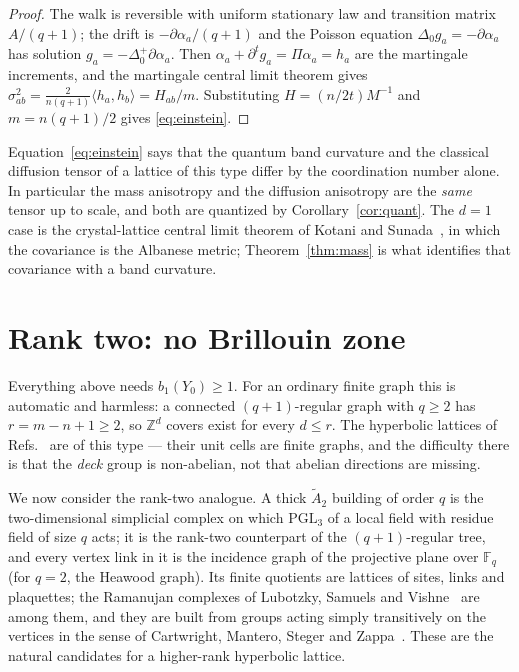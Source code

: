 \documentclass[aps,prb,reprint,amsmath,amssymb,floatfix,superscriptaddress]{revtex4-2}
\theoremstyle{plain}
\theoremstyle{definition}
\theoremstyle{remark}
\newcommand{\Z}{\mathbb{Z}}
\newcommand{\Atwo}{\widetilde A_2}
\begin{document}
\begin{proof}
The walk is reversible with uniform stationary law and transition matrix $A/(q{+}1)$; the
drift is $-\partial\alpha_a/(q{+}1)$ and the Poisson equation $\Delta_0g_a=-\partial\alpha_a$
has solution $g_a=-\Delta_0^{+}\partial\alpha_a$. Then
$\alpha_a+\partial^{t}g_a=\Pi\alpha_a=h_a$ are the martingale increments, and the
martingale central limit theorem gives
$\sigma^{2}_{ab}=\frac{2}{n(q+1)}\langle h_a,h_b\rangle=H_{ab}/m$. Substituting
$H=(n/2t)M^{-1}$ and $m=n(q{+}1)/2$ gives \eqref{eq:einstein}.
\end{proof}

Equation~\eqref{eq:einstein} says that the quantum band curvature and the classical
diffusion tensor of a lattice of this type differ by the coordination number alone. In
particular the mass anisotropy and the diffusion anisotropy are the \emph{same} tensor up
to scale, and both are quantized by Corollary~\ref{cor:quant}. The $d=1$ case is the
crystal-lattice central limit theorem of Kotani and Sunada~\cite{KS1}, in which the
covariance is the Albanese metric; Theorem~\ref{thm:mass} is what identifies that covariance
with a band curvature.

\section{Rank two: no Brillouin zone}\label{sec:nogo}

Everything above needs $b_1(Y_0)\ge1$. For an ordinary finite graph this is automatic and
harmless: a connected $(q{+}1)$-regular graph with $q\ge2$ has $r=m-n+1\ge2$, so $\Z^{d}$
covers exist for every $d\le r$. The hyperbolic lattices of Refs.~ are
of this type --- their unit cells are finite graphs, and the difficulty there is that the
\emph{deck} group is non-abelian, not that abelian directions are missing.

We now consider the rank-two analogue. A thick $\Atwo$ building of order $q$ is the
two-dimensional simplicial complex on which $\mathrm{PGL}_3$ of a local field with residue
field of size $q$ acts; it is the rank-two counterpart of the $(q{+}1)$-regular tree, and
every vertex link in it is the incidence graph of the projective plane over $\mathbb F_q$
(for $q=2$, the Heawood graph). Its finite quotients are lattices of sites, links and
plaquettes; the Ramanujan complexes of Lubotzky, Samuels and Vishne~\cite{LSV} are among
them, and they are built from groups acting simply transitively on the vertices in the sense
of Cartwright, Mantero, Steger and Zappa~\cite{CMSZ}. These are the natural candidates for a
higher-rank hyperbolic lattice.
\end{document}
